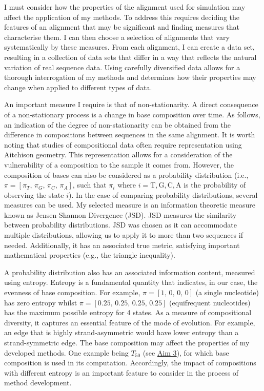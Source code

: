 I must consider how the properties of the alignment used for simulation may affect the application of my methods. To address this requires deciding the features of an alignment that may be significant and finding measures that characterise them. I can then choose a selection of alignments that vary systematically by these measures. From each alignment, I can create a data set, resulting in a collection of data sets that differ in a way that reflects the natural variation of real sequence data. Using carefully diversified data allows for a thorough interrogation of my methods and determines how their properties may change when applied to different types of data.

An important measure I require is that of non-stationarity. A direct consequence of a non-stationary process is a change in base composition over time. As follows, an indication of the degree of non-stationarity can be obtained from the difference in compositions between sequences in the same alignment. It is worth noting that studies of compositional data often require representation using Aitchison geometry. This representation allows for a consideration of the vulnerability of a composition to the sample it comes from. However, the composition of bases can also be considered as a probability distribution (i.e., $\pi = [\pi_T,\, \pi_G, \, \pi_C, \, \pi_A]$, such that $\pi_i$ where $i= \mathrm{T}, \mathrm{G}, \mathrm{C}, \mathrm{A}$ is the probability of observing the state $i$). In the case of comparing probability distributions, several measures can be used. My selected measure is an information theoretic measure known as Jensen-Shannon Divergence (JSD). JSD measures the similarity between probability distributions. JSD was chosen as it can accommodate multiple distributions, allowing us to apply it to more than two sequences if needed. Additionally, it has an associated true metric, satisfying important mathematical properties (e.g., the triangle inequality). 

A probability distribution also has an associated information content, measured using entropy. Entropy is a fundamental quantity that indicates, in our case, the evenness of base composition. For example, $\pi =[1,\, 0,\, 0,\, 0]$  (a single nucleotide) has zero entropy whilst  $\pi =[0.25,\, 0.25,\, 0.25,\, 0.25]$ (equifrequent nucleotides) has the maximum possible entropy for 4 states. As a measure of compositional diversity, it captures an essential feature of the mode of evolution. For example, an edge that is highly \gls{strand-asymmetric} would have lower entropy than a \gls{strand-symmetric} edge. The base composition may affect the properties of my developed methods. One example being $T_{50}$ (see \hyperref[aim3]{Aim 3}), for which base composition is used in its computation. Accordingly, the impact of compositions with different entropy is an important feature to consider in the process of method development.

